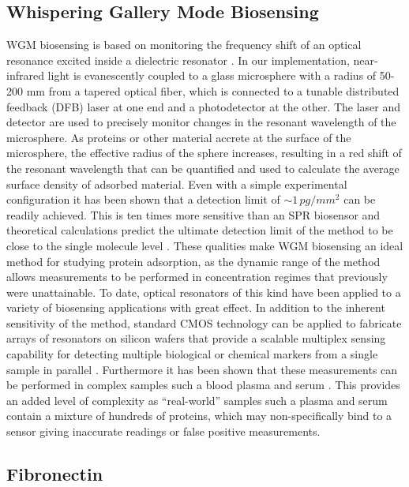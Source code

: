 \subsection{Whispering Gallery Mode Biosensing}

WGM biosensing is based on monitoring the frequency shift of an optical
resonance excited inside a dielectric resonator \cite{Vollmer2005,Vollmer2002}.
In our implementation, near-infrared light is evanescently coupled
to a glass microsphere with a radius of 50-200 \textgreek{m}m from
a tapered optical fiber, which is connected to a tunable distributed
feedback (DFB) laser at one end and a photodetector at the other.
The laser and detector are used to precisely monitor changes in the
resonant wavelength of the microsphere. As proteins or other material
accrete at the surface of the microsphere, the effective radius of
the sphere increases, resulting in a red shift of the resonant wavelength
that can be quantified and used to calculate the average surface density
of adsorbed material. Even with a simple experimental configuration
\cite{Vollmer2002} it has been shown that a detection limit of $\sim1\, pg/mm^{2}$
can be readily achieved. This is ten times more sensitive than an
SPR biosensor and theoretical calculations predict the ultimate detection
limit of the method to be close to the single molecule level \cite{Armani2003,Vollmer2008,Vollmer2008a,Arnold2003}.
These qualities make WGM biosensing an ideal method for studying protein
adsorption, as the dynamic range of the method allows measurements
to be performed in concentration regimes that previously were unattainable.
To date, optical resonators of this kind have been applied to a variety
of biosensing applications with great effect. In addition to the inherent
sensitivity of the method, standard CMOS technology can be applied
to fabricate arrays of resonators on silicon wafers that provide a
scalable multiplex sensing capability for detecting multiple biological
or chemical markers from a single sample in parallel \cite{Luchansky2010,Washburn2009}.
Furthermore it has been shown that these measurements can be performed
in complex samples such a blood plasma and serum \cite{Luchansky2011}.
This provides an added level of complexity as {}``real-world'' samples
such a plasma and serum contain a mixture of hundreds of proteins,
which may non-specifically bind to a sensor giving inaccurate readings
or false positive measurements. 


\subsection{Fibronectin}

